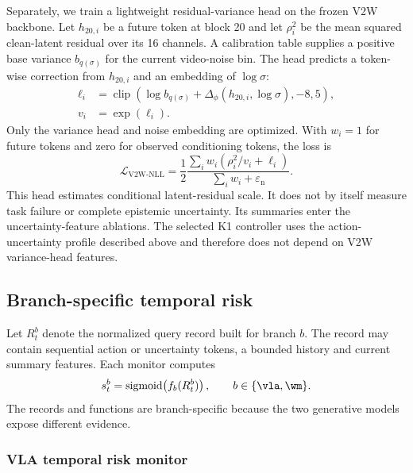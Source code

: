Separately, we train a lightweight residual-variance head on the frozen V2W
backbone. Let \(h_{20,i}\) be a future token at block 20 and let
\(\rho_i^2\) be the mean squared clean-latent residual over its 16 channels. A
calibration table supplies a positive base variance
\(b_{q(\sigma)}\) for the current video-noise bin. The head predicts a
token-wise correction from \(h_{20,i}\) and an embedding of \(\log\sigma\):
\begin{equation}
  \begin{aligned}
    \ell_i &=
    \operatorname{clip}\!\left(
      \log b_{q(\sigma)}
      +\Delta_\phi(h_{20,i},\log\sigma),-8,5
    \right),\\
    v_i&=\exp(\ell_i).
  \end{aligned}
  \label{eq:v2w-variance}
\end{equation}
Only the variance head and noise embedding are optimized. With \(w_i=1\) for
future tokens and zero for observed conditioning tokens, the loss is
\begin{equation}
  \mathcal{L}_{\mathrm{V2W\mbox{-}NLL}}
  =
  \frac{1}{2}
  \frac{\sum_i w_i\left(\rho_i^2/v_i+\ell_i\right)}
       {\sum_i w_i+\varepsilon_{\mathrm{n}}}.
  \label{eq:v2w-nll}
\end{equation}
This head estimates conditional latent-residual scale. It does not by itself
measure task failure or complete epistemic uncertainty. Its summaries enter
the uncertainty-feature ablations. The selected K1 controller uses the
action-uncertainty profile described above and therefore does not depend on
V2W variance-head features.

\subsection{Branch-specific temporal risk}

Let \(R_t^b\) denote the normalized query record built for branch \(b\). The
record may contain sequential action or uncertainty tokens, a bounded history
and current summary features. Each monitor computes
\begin{equation}
  s_t^b=\operatorname{sigmoid}\!\left(f_b(R_t^b)\right),
  \qquad b\in\{\vla,\wm\}.
  \label{eq:risk-score}
\end{equation}
The records and functions are branch-specific because the two generative
models expose different evidence.

\subsubsection{VLA temporal risk monitor}

